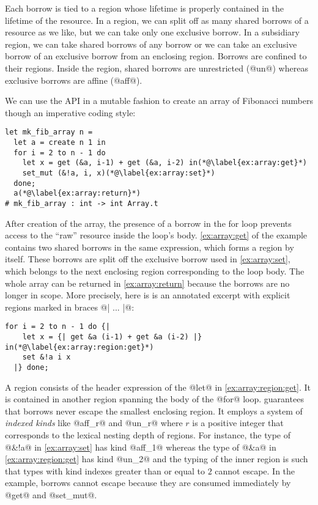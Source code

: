 Each borrow is tied to a region whose lifetime is properly
contained in the lifetime of the resource.
In a region, we can split off as many shared borrows of a resource as
we like, but we can take only one exclusive borrow. In a
subsidiary region, we can take shared borrows of any
borrow or we can take an exclusive borrow of an exclusive borrow from an
enclosing region. Borrows are confined to their regions. Inside the region,
shared borrows are unrestricted (@un@) whereas exclusive
borrows are affine (@aff@).

We can use the API in a mutable fashion
to create an
array of Fibonacci numbers though an imperative coding style:
\begin{lstlisting}
let mk_fib_array n =
  let a = create n 1 in
  for i = 2 to n - 1 do
    let x = get (&a, i-1) + get (&a, i-2) in(*@\label{ex:array:get}*)
    set_mut (&!a, i, x)(*@\label{ex:array:set}*)
  done;
  a(*@\label{ex:array:return}*)
# mk_fib_array : int -> int Array.t
\end{lstlisting}

After
creation of the array, the presence of a borrow in the for loop
prevents access to the ``raw'' resource inside the loop's
body. \cref{ex:array:get} of the example contains two shared borrows
in the same expression, which forms a region by itself. These borrows
are split off the exclusive borrow used in \cref{ex:array:set}, which
belongs to the next enclosing region corresponding to the loop body.
The whole array can be returned in \cref{ex:array:return} because  the
borrows are no longer in scope. 
%
More precisely, here is is an annotated excerpt with explicit regions
marked in braces @{| ... |}@:

\begin{lstlisting}[firstnumber=3]
  for i = 2 to n - 1 do {|
    let x = {| get &a (i-1) + get &a (i-2) |} in(*@\label{ex:array:region:get}*)
    set &!a i x
  |} done;
\end{lstlisting}

A region consists of the header expression of the @let@ in
\cref{ex:array:region:get}. It is contained in another region
spanning the body of the @for@ loop. \lang guarantees that borrows
never escape the smallest enclosing region. It employs a system of
\emph{indexed kinds} like @aff_r@ and @un_r@ where
$r$ is a positive integer that corresponds to the lexical nesting
depth of regions. For instance, the type of @&!a@ in
\cref{ex:array:set} has kind @aff_1@ whereas the type of
@&a@ in \cref{ex:array:region:get} has kind
@un_2@ and the typing of the inner region is such that types with
kind indexes greater than or equal to $2$ cannot escape.
In the example, borrows cannot escape  because they are consumed
immediately by @get@ and @set_mut@.

